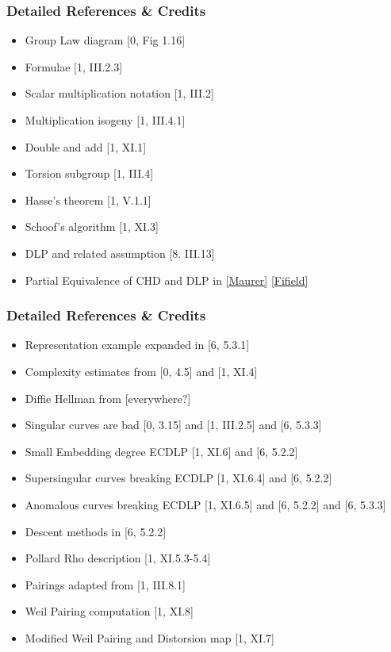 \documentclass{beamer}
\begin{document}
\begin{frame}[noframenumbering]
    \frametitle{Detailed References \& Credits}
   \begin{itemize}
       \item Group Law diagram [0, Fig 1.16]
       \item Formulae [1, III.2.3]
       \item Scalar multiplication notation [1, III.2]
       \item Multiplication isogeny [1, III.4.1]
       \item Double and add [1, XI.1]
       \item Torsion subgroup [1, III.4]
       \item Hasse's theorem [1, V.1.1]
       \item Schoof's algorithm [1, XI.3]
       \item DLP and related assumption [8. III.13]
       \item Partial Equivalence of CHD and DLP in \href{https://crypto.ethz.ch/publications/Maurer94.html}{[Maurer]} \href{https://citeseerx.ist.psu.edu/viewdoc/download?doi=10.1.1.232.8069&rep=rep1&type=pdf}{[Fifield]}
       
   \end{itemize}
\end{frame}

\begin{frame}[noframenumbering]
    \frametitle{Detailed References \& Credits}
    \begin{itemize}
    \item Representation example expanded in [6, 5.3.1]
       \item Complexity estimates from [0, 4.5] and [1, XI.4]
       \item Diffie Hellman from [everywhere?]
       \item Singular curves are bad [0, 3.15] and [1, III.2.5] and [6, 5.3.3]
       \item Small Embedding degree ECDLP [1, XI.6] and [6, 5.2.2]
       \item Supersingular curves breaking ECDLP [1, XI.6.4] and [6, 5.2.2]
       \item Anomalous curves breaking ECDLP [1, XI.6.5] and [6, 5.2.2] and [6, 5.3.3]
       \item Descent methods in [6, 5.2.2]
        \item Pollard Rho description [1, XI.5.3-5.4]
        \item Pairings adapted from [1, III.8.1]
        \item Weil Pairing computation [1, XI.8]
        \item Modified Weil Pairing and Distorsion map [1, XI.7]
      \end{itemize}
\end{frame}
\end{document}
